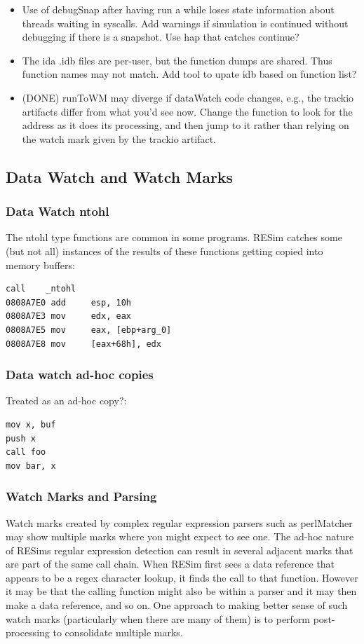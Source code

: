 \documentclass[titlepage]{article}
\begin{document}
\begin{appendices}
\begin{itemize}
\item Use of debugSnap after having run a while loses state information about threads waiting in syscalls.  Add warnings if simulation is
continued without debugging if there is a snapshot.  Use hap that catches continue?

\item The ida .idb files are per-user, but the function dumps are shared.  Thus function names may not match.  Add tool to upate idb based
on function list?

\item (DONE) runToWM may diverge if dataWatch code changes, e.g., the trackio artifacts differ from what you'd see now.  Change the function to
look for the address as it does its processing, and then jump to it rather than relying on the watch mark  given by the trackio artifact.
\end{itemize}

\subsection{Data Watch and Watch Marks}
\subsubsection{Data Watch ntohl}
The ntohl type functions are common in some programs.  RESim catches some (but not all) instances of the results of these functions getting copied into memory buffers:
\begin{verbatim}
call    _ntohl
0808A7E0 add     esp, 10h
0808A7E3 mov     edx, eax
0808A7E5 mov     eax, [ebp+arg_0]
0808A7E8 mov     [eax+68h], edx
\end{verbatim}

\subsubsection{Data watch ad-hoc copies}
Treated as an ad-hoc copy?:
\begin{verbatim}
mov x, buf
push x
call foo
mov bar, x
\end{verbatim}

\subsubsection{Watch Marks and Parsing}
Watch marks created by complex regular expression parsers such as perlMatcher may show multiple marks where you might expect to see one.  The ad-hoc nature
of RESims regular expression detection can result in several adjacent marks that are part of the same call chain.  When RESim first sees a data reference
that appears to be a regex character lookup, it finds the call to that function.  However it may be that the calling function might also be within a parser
and it may then make a data reference, and so on.  One approach to making better sense of such watch marks (particularly when there are many of them) is
to perform post-processing to consolidate multiple marks. 


\end{appendices}
\end{document}
